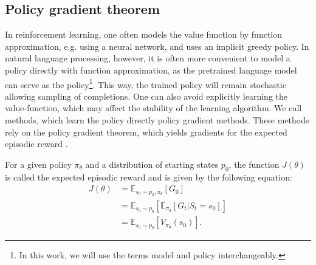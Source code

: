 




\subsection{Policy gradient theorem}

In reinforcement learning, one often models the value function by function approximation, e.g. using a neural network, and uses an implicit greedy policy. In natural language processing, however, it is often more convenient to model a policy directly with function approximation, as the pretrained language model can serve as the policy\protect\footnote{In this work, we will use the terms model and policy interchangeably.}. This way, the trained policy will remain stochastic allowing sampling of completions. One can also avoid explicitly learning the value-function, which may affect the stability of the learning algorithm. We call methods, which learn the policy directly policy gradient methods. These methods rely on the policy gradient theorem, which yields gradients for the expected episodic reward \cite{lehmann2024definitiveguidepolicygradients}.

\begin{definition}
    For a given policy $\pi_\theta$ and a distribution of starting states $p_0$, the function $J(\theta)$ is called the expected episodic reward and is given by the following equation:
    \begin{align*}
        J(\theta) &= \mathbb{E}_{s_0\sim p_0,\pi_\theta}[G_0]\\
        &= \mathbb{E}_{s_0\sim p_0}[\mathbb{E}_{\pi_\theta}[G_t | S_t = s_0]]\\
        &= \mathbb{E}_{s_0\sim p_0}[V_{\pi_\theta}(s_0)].
    \end{align*}
\end{definition}

